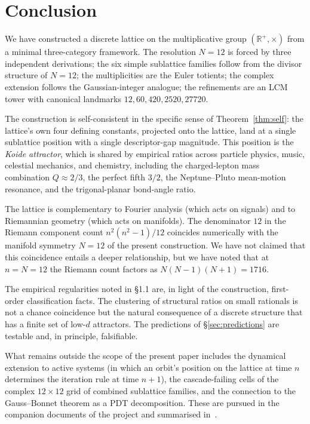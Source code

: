 \documentclass[11pt,a4paper]{article}
\theoremstyle{definition}
\theoremstyle{remark}
\newcommand{\R}{\mathbb{R}}
\begin{document}
\section{Conclusion}\label{sec:conclusion}

We have constructed a discrete lattice on the multiplicative group $(\R^{+},\times)$ from a minimal three-category framework. The resolution $N=12$ is forced by three independent derivations; the six simple sublattice families follow from the divisor structure of $N=12$; the multiplicities are the Euler totients; the complex extension follows the Gaussian-integer analogue; the refinements are an LCM tower with canonical landmarks $12, 60, 420, 2520, 27720$.

The construction is self-consistent in the specific sense of Theorem~\ref{thm:self}: the lattice's own four defining constants, projected onto the lattice, land at a single sublattice position with a single descriptor-gap magnitude. This position is the \emph{Koide attractor}, which is shared by empirical ratios across particle physics, music, celestial mechanics, and chemistry, including the charged-lepton mass combination $Q\approx 2/3$, the perfect fifth $3/2$, the Neptune--Pluto mean-motion resonance, and the trigonal-planar bond-angle ratio.

The lattice is complementary to Fourier analysis (which acts on signals) and to Riemannian geometry (which acts on manifolds). The denominator $12$ in the Riemann component count $n^{2}(n^{2}-1)/12$ coincides numerically with the manifold symmetry $N=12$ of the present construction. We have not claimed that this coincidence entails a deeper relationship, but we have noted that at $n=N=12$ the Riemann count factors as $N(N-1)(N+1)=1716$.

The empirical regularities noted in \S1.1 are, in light of the construction, first-order classification facts. The clustering of structural ratios on small rationals is not a chance coincidence but the natural consequence of a discrete structure that has a finite set of low-$d$ attractors. The predictions of \S\ref{sec:predictions} are testable and, in principle, falsifiable.

What remains outside the scope of the present paper includes the dynamical extension to active systems (in which an orbit's position on the lattice at time $n$ determines the iteration rule at time $n+1$), the cascade-failing cells of the complex $12\times 12$ grid of combined sublattice families, and the connection to the Gauss--Bonnet theorem as a PDT decomposition. These are pursued in the companion documents of the project and summarised in~\cite{Guide}.
\end{document}
